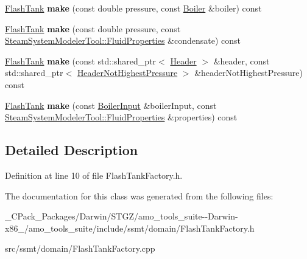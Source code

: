 \begin{DoxyCompactItemize}
\item 
\mbox{\label{class_flash_tank_factory_a068b5e4eb6ad0390fb93817e0b9890f5}} 
\hyperlink{class_flash_tank}{Flash\+Tank} {\bfseries make} (const double pressure, const \hyperlink{class_boiler}{Boiler} \&boiler) const
\item 
\mbox{\label{class_flash_tank_factory_aceaed241ae5afb2b626c47d83c18f4e3}} 
\hyperlink{class_flash_tank}{Flash\+Tank} {\bfseries make} (const double pressure, const \hyperlink{struct_steam_system_modeler_tool_1_1_fluid_properties}{Steam\+System\+Modeler\+Tool\+::\+Fluid\+Properties} \&condensate) const
\item 
\mbox{\label{class_flash_tank_factory_a5daa9bc5b88ff891aa1b7db0723f5980}} 
\hyperlink{class_flash_tank}{Flash\+Tank} {\bfseries make} (const std\+::shared\+\_\+ptr$<$ \hyperlink{class_header}{Header} $>$ \&header, const std\+::shared\+\_\+ptr$<$ \hyperlink{class_header_not_highest_pressure}{Header\+Not\+Highest\+Pressure} $>$ \&header\+Not\+Highest\+Pressure) const
\item 
\mbox{\label{class_flash_tank_factory_a7b4ce87e0835a859903e182efe211af1}} 
\hyperlink{class_flash_tank}{Flash\+Tank} {\bfseries make} (const \hyperlink{class_boiler_input}{Boiler\+Input} \&boiler\+Input, const \hyperlink{struct_steam_system_modeler_tool_1_1_fluid_properties}{Steam\+System\+Modeler\+Tool\+::\+Fluid\+Properties} \&properties) const
\end{DoxyCompactItemize}


\subsection{Detailed Description}


Definition at line 10 of file Flash\+Tank\+Factory.\+h.



The documentation for this class was generated from the following files\+:\begin{DoxyCompactItemize}
\item 
\+\_\+\+C\+Pack\+\_\+\+Packages/\+Darwin/\+S\+T\+G\+Z/amo\+\_\+tools\+\_\+suite-\/-\/\+Darwin-\/x86\+\_/amo\+\_\+tools\+\_\+suite/include/ssmt/domain/Flash\+Tank\+Factory.\+h\item 
src/ssmt/domain/Flash\+Tank\+Factory.\+cpp\end{DoxyCompactItemize}

